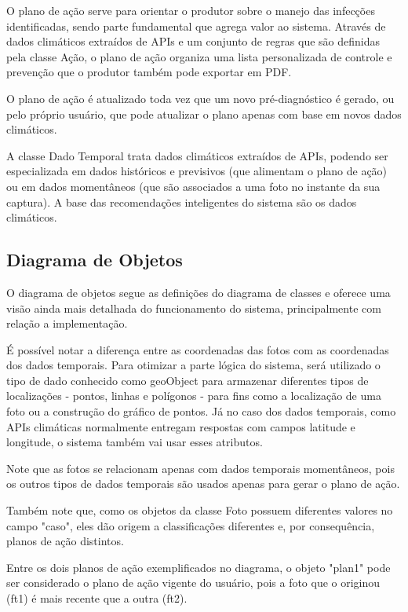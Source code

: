 \documentclass[
  a4paper,%
  12pt,%
  english,%
  brazilian,%
]{article}
\begin{document}
     O plano de ação serve para orientar o produtor sobre o manejo das infecções identificadas, sendo parte fundamental que agrega valor ao sistema. Através de dados climáticos extraídos de APIs e um conjunto de regras que são definidas pela classe Ação, o plano de ação organiza uma lista personalizada de controle e prevenção que o produtor também pode exportar em PDF.
     
     O plano de ação é atualizado toda vez que um novo pré-diagnóstico é gerado, ou pelo próprio usuário, que pode atualizar o plano apenas com base em novos dados climáticos. 

     A classe Dado Temporal trata dados climáticos extraídos de APIs, podendo ser especializada em dados históricos e previsivos (que alimentam o plano de ação) ou em dados momentâneos (que são associados a uma foto no instante da sua captura). A base das recomendações inteligentes do sistema são os dados climáticos.


    \subsection*{Diagrama de Objetos}

    O diagrama de objetos segue as definições do diagrama de classes e oferece uma visão ainda mais detalhada do funcionamento do sistema, principalmente com relação a implementação.

    É possível notar a diferença entre as coordenadas das fotos com as coordenadas dos dados temporais. Para otimizar a parte lógica do sistema, será utilizado o tipo de dado conhecido como geoObject para armazenar diferentes tipos de localizações - pontos, linhas e polígonos - para fins como a localização de uma foto ou a construção do gráfico de pontos. Já no caso dos dados temporais, como APIs climáticas normalmente entregam respostas com campos latitude e longitude, o sistema também vai usar esses atributos. 

    Note que as fotos se relacionam apenas com dados temporais momentâneos, pois os outros tipos de dados temporais são usados apenas para gerar o plano de ação.

    Também note que, como os objetos da classe Foto possuem diferentes valores no campo "caso", eles dão origem a classificações diferentes e, por consequência, planos de ação distintos.

    Entre os dois planos de ação exemplificados no diagrama, o objeto "plan1" pode ser considerado o plano de ação vigente do usuário, pois a foto que o originou (ft1) é mais recente que a outra (ft2).
\end{document}
